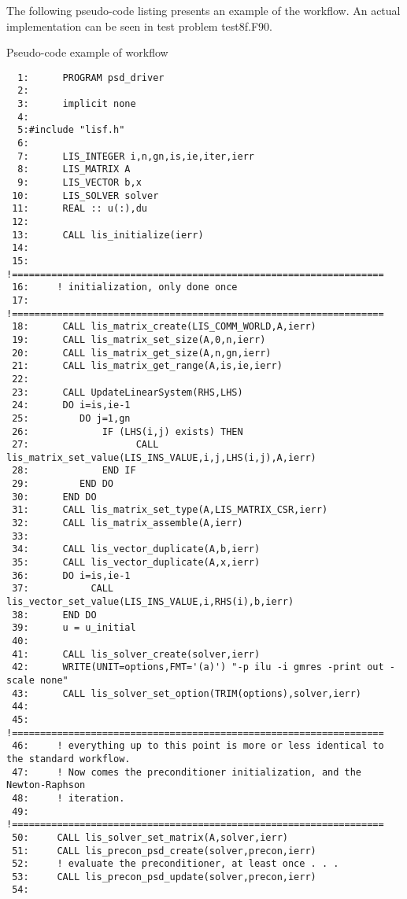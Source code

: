 \documentclass[a4paper]{article}
\begin{document}
\vspace{1pc}

The following pseudo-code listing presents an example of the workflow.
An actual implementation can be seen in test problem test8f.F90.

\vspace{1pc}

\begin{itemsquarebox}[l]{Pseudo-code example of workflow}
{\small
\begin{verbatim}
  1:      PROGRAM psd_driver
  2:
  3:      implicit none
  4:      
  5:#include "lisf.h"
  6:
  7:      LIS_INTEGER i,n,gn,is,ie,iter,ierr
  8:      LIS_MATRIX A
  9:      LIS_VECTOR b,x
 10:      LIS_SOLVER solver
 11:      REAL :: u(:),du
 12:
 13:      CALL lis_initialize(ierr)
 14:
 15:     !==================================================================
 16:     ! initialization, only done once
 17:     !==================================================================
 18:      CALL lis_matrix_create(LIS_COMM_WORLD,A,ierr)
 19:      CALL lis_matrix_set_size(A,0,n,ierr)
 20:      CALL lis_matrix_get_size(A,n,gn,ierr)
 21:      CALL lis_matrix_get_range(A,is,ie,ierr)
 22:
 23:      CALL UpdateLinearSystem(RHS,LHS)
 24:      DO i=is,ie-1
 25:         DO j=1,gn
 26:             IF (LHS(i,j) exists) THEN
 27:                   CALL lis_matrix_set_value(LIS_INS_VALUE,i,j,LHS(i,j),A,ierr)
 28:             END IF
 29:         END DO
 30:      END DO
 31:      CALL lis_matrix_set_type(A,LIS_MATRIX_CSR,ierr)
 32:      CALL lis_matrix_assemble(A,ierr)
 33:
 34:      CALL lis_vector_duplicate(A,b,ierr)
 35:      CALL lis_vector_duplicate(A,x,ierr)
 36:      DO i=is,ie-1
 37:           CALL lis_vector_set_value(LIS_INS_VALUE,i,RHS(i),b,ierr)
 38:      END DO
 39:      u = u_initial
 40:
 41:      CALL lis_solver_create(solver,ierr)
 42:      WRITE(UNIT=options,FMT='(a)') "-p ilu -i gmres -print out -scale none"
 43:      CALL lis_solver_set_option(TRIM(options),solver,ierr)
 44:
 45:     !==================================================================
 46:     ! everything up to this point is more or less identical to the standard workflow.
 47:     ! Now comes the preconditioner initialization, and the Newton-Raphson
 48:     ! iteration.
 49:     !==================================================================
 50:     CALL lis_solver_set_matrix(A,solver,ierr)
 51:     CALL lis_precon_psd_create(solver,precon,ierr)
 52:     ! evaluate the preconditioner, at least once . . .
 53:     CALL lis_precon_psd_update(solver,precon,ierr)
 54:
\end{verbatim}
}
\end{itemsquarebox}
\end{document}

